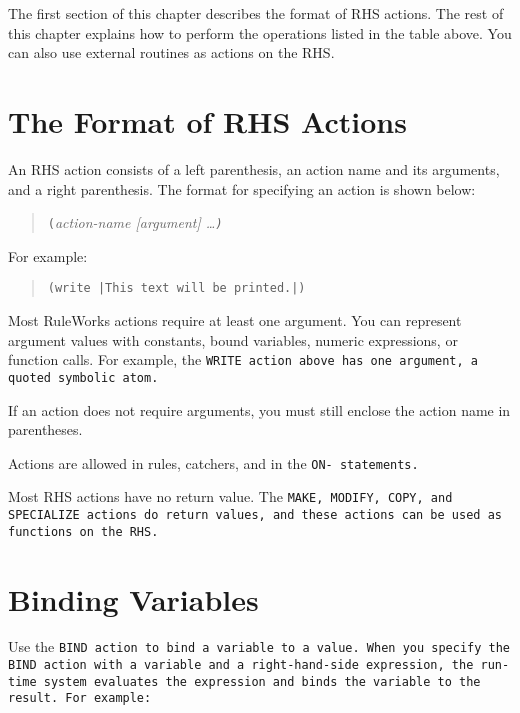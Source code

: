 The first section of this chapter describes the format of RHS
actions. The rest of this chapter explains how to perform the
operations listed in the table above. You can also use external
routines as actions on the RHS.

\section{The Format of RHS Actions}

An RHS action consists of a left parenthesis, an action name and its
arguments, and a right parenthesis. The format for specifying an
action is shown below:

\begin{quote}
\verb|(|\it{action-name} [\it{argument}] \ldots\verb|)|
\end{quote}

For example:

\begin{quote}
\begin{verbatim}
(write |This text will be printed.|)
\end{verbatim}
\end{quote}

Most RuleWorks actions require at least one argument. You can
represent argument values with constants, bound variables, numeric
expressions, or function calls. For example, the \tt{WRITE} action
above has one argument, a quoted symbolic atom.

\begin{note}
  If an action does not require arguments, you must still enclose the
  action name in parentheses.
\end{note}

Actions are allowed in rules, catchers, and in the \tt{ON-}
statements.

Most RHS actions have no return value. The \tt{MAKE}, \tt{MODIFY},
\tt{COPY}, and \tt{SPECIALIZE} actions do return values, and these
actions can be used as functions on the RHS.

\section{Binding Variables}

Use the \tt{BIND} action to bind a variable to a
value. When you specify the \tt{BIND} action with a
variable and a right-hand-side expression, the
run-time system evaluates the expression and
binds the variable to the result. For example:

